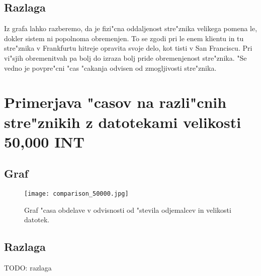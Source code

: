 \subsection{Razlaga}
Iz grafa lahko razberemo, da je fizi"cna oddaljenost stre"znika velikega pomena le, dokler sistem ni popolnoma obremenjen. To se zgodi pri le enem klientu in tu stre"znika v Frankfurtu hitreje opravita svoje delo, kot tisti v San Franciscu.
Pri vi"sjih obremenitvah pa bolj do izraza bolj pride obremenjenost stre"znika. "Se vedno je povpre"cni "cas "cakanja odvisen od zmogljivosti stre"znika. 


\section{Primerjava "casov na razli"cnih stre"znikih z datotekami velikosti 50,000 INT}

\subsection{Graf}
\begin{figure}
  \centering
    \texttt{[image: comparison\_50000.jpg]}
  \caption{Graf "casa obdelave v odvisnosti od "stevila odjemalcev in velikosti datotek.}
  \label{8_graph_comparison_50000}
\end{figure}

\subsection{Razlaga}
TODO: razlaga	






